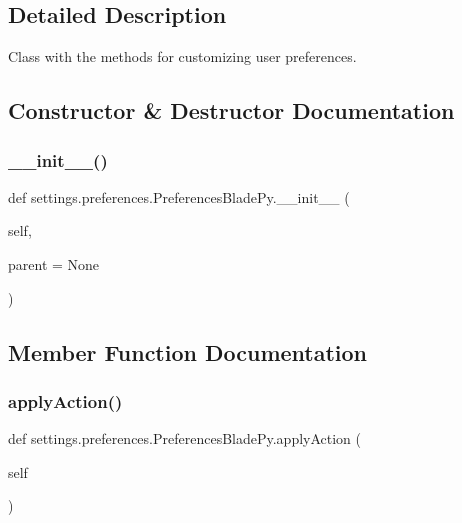 \subsection{Detailed Description}
Class with the methods for customizing user preferences. 

\subsection{Constructor \& Destructor Documentation}
\hypertarget{a00102_af773a0c74e666c299d2334a21966f8c9}{}\label{a00102_af773a0c74e666c299d2334a21966f8c9} 
\subsubsection{\texorpdfstring{\+\_\+\+\_\+init\+\_\+\+\_\+()}{\_\_init\_\_()}}
{\footnotesize\ttfamily def settings.\+preferences.\+Preferences\+Blade\+Py.\+\_\+\+\_\+init\+\_\+\+\_\+ (\begin{DoxyParamCaption}\item[{}]{self,  }\item[{}]{parent = {\ttfamily None} }\end{DoxyParamCaption})}



\subsection{Member Function Documentation}
\hypertarget{a00102_a8938a7b43ca7c5496a0ae7bf8d6a0c54}{}\label{a00102_a8938a7b43ca7c5496a0ae7bf8d6a0c54} 
\subsubsection{\texorpdfstring{apply\+Action()}{applyAction()}}
{\footnotesize\ttfamily def settings.\+preferences.\+Preferences\+Blade\+Py.\+apply\+Action (\begin{DoxyParamCaption}\item[{}]{self }\end{DoxyParamCaption})}



